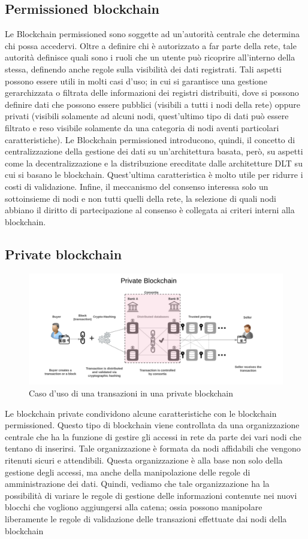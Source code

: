 \subsection{Permissioned blockchain}
Le Blockchain permissioned sono soggette ad un’autorità centrale che determina chi possa accedervi. Oltre a definire chi è autorizzato a far parte della rete, tale autorità definisce quali sono i ruoli che un utente può ricoprire all’interno della stessa, definendo anche regole sulla visibilità dei dati registrati. Tali aspetti possono essere utili in molti casi d'uso; in cui si garantisce una gestione gerarchizzata o filtrata delle informazioni dei registri distribuiti, dove si possono definire dati che possono essere pubblici (visibili a tutti i nodi della rete) oppure privati (visibili solamente ad alcuni nodi, quest'ultimo tipo di dati può essere filtrato e reso visibile solamente da una categoria di nodi aventi particolari caratteristiche). Le Blockchain permissioned introducono, quindi, il concetto di centralizzazione della gestione dei dati su un'architettura basata, però, su aspetti come la decentralizzazione e la distribuzione erecditate dalle architetture DLT su cui si basano le blockchain. Quest'ultima caratteristica è molto utile per ridurre i costi di validazione. Infine, il meccanismo del consenso interessa solo un sottoinsieme di nodi e non tutti quelli della rete, la selezione di quali nodi abbiano il diritto di partecipazione al consenso è collegata ai criteri interni alla blockchain. 
\subsection{Private blockchain}
\begin{figure}[h]
    \centering
    \includegraphics[width=1\textwidth]{img/private-blockchain.png}
    \caption{Caso d'uso di una transazioni in una private blockchain}
    \label{fig:private-blockchain}
\end{figure}
Le blockchain private condividono alcune caratteristiche con le blockchain permissioned. Questo tipo di blockchain viene controllata da una organizzazione centrale che ha la funzione di gestire gli accessi in rete da parte dei vari nodi che tentano di inserirsi. Tale organizzazione è formata da nodi affidabili che vengono ritenuti sicuri e attendibili. Questa organizzazione è alla base non solo della gestione degli accessi, ma anche della manipolazione delle regole di amministrazione dei dati. Quindi, vediamo che tale organizzazione ha la possibilità di variare le regole di gestione delle informazioni contenute nei nuovi blocchi che vogliono aggiungersi alla catena; ossia possono manipolare liberamente le regole di validazione delle transazioni effettuate dai nodi della blockchain
